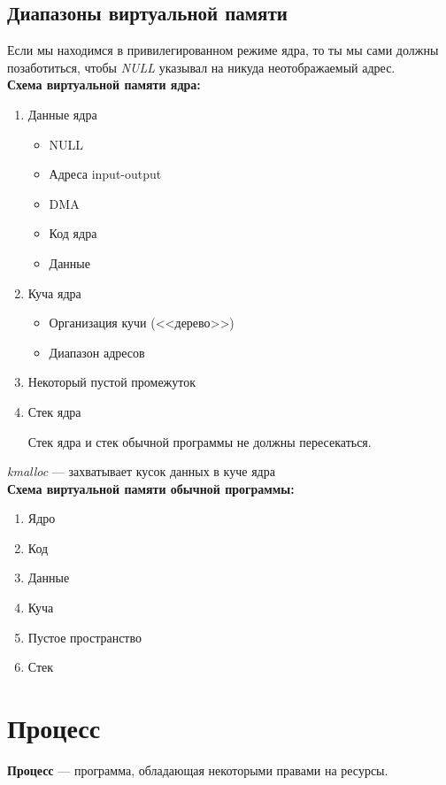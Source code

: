 \subsection*{Диапазоны виртуальной памяти}

Если мы находимся в привилегированном режиме ядра, то ты мы сами должны позаботиться, чтобы \textit{NULL} указывал на никуда неотображаемый адрес.
\\

\textbf{Схема виртуальной памяти ядра:}
\begin{enumerate}
\item Данные ядра
\begin{itemize}
\item NULL
\item Адреса input-output
\item DMA
\item Код ядра
\item Данные
\end{itemize}
\item Куча ядра
\begin{itemize}
\item Организация кучи (<<дерево>>)
\item Диапазон адресов
\end{itemize}
\item Некоторый пустой промежуток
\item Стек ядра

Стек ядра и стек обычной программы не должны пересекаться.
\end{enumerate}

\textit{kmalloc} --- захватывает кусок данных в куче ядра
\\

\textbf{Схема виртуальной памяти обычной программы:}
\begin{enumerate}
\item Ядро
\item Код
\item Данные
\item Куча
\item Пустое пространство
\item Стек
\end{enumerate}

\section{Процесс}

\textbf{Процесс} --- программа, обладающая некоторыми правами на ресурсы.
\\

